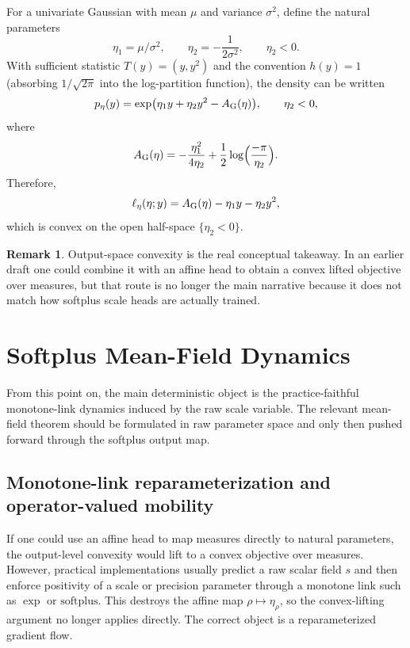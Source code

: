 \documentclass[11pt]{article}
\theoremstyle{definition}
\newtheorem{remark}[theorem]{Remark}
\begin{document}
For a univariate Gaussian with mean $\mu$ and variance $\sigma^2$, define the
natural parameters
\begin{equation}
  \eta_1 = \mu/\sigma^2,
  \qquad
  \eta_2 = -\frac{1}{2\sigma^2},
  \qquad
  \eta_2 < 0.
\end{equation}
With sufficient statistic $T(y)=(y,y^2)$ and the convention $h(y)=1$
(absorbing $1/\sqrt{2\pi}$ into the log-partition function), the density can
be written
\begin{equation}
  p_\eta(y) = \exp\!\big(\eta_1 y + \eta_2 y^2 - A_{\rm G}(\eta)\big),
  \qquad \eta_2<0,
\end{equation}
where
\begin{equation}
  A_{\rm G}(\eta)
  =
  -\frac{\eta_1^2}{4\eta_2}
  + \frac12 \log\!\Big(\frac{-\pi}{\eta_2}\Big).
\end{equation}
Therefore,
\begin{equation}
  \ell_{\eta}(\eta;y)
  =
  A_{\rm G}(\eta) - \eta_1 y - \eta_2 y^2,
\end{equation}
which is convex on the open half-space $\{\eta_2<0\}$.

\begin{remark}
Output-space convexity is the real conceptual takeaway. In an earlier draft one
could combine it with an affine head to obtain a convex lifted objective over
measures, but that route is no longer the main narrative because it does not
match how softplus scale heads are actually trained.
\end{remark}

\section{Softplus Mean-Field Dynamics}

From this point on, the main deterministic object is the practice-faithful
monotone-link dynamics induced by the raw scale variable. The relevant
mean-field theorem should be formulated in raw parameter space and only then
pushed forward through the softplus output map.

\subsection{Monotone-link reparameterization and operator-valued mobility}

If one could use an affine head to map measures directly to natural parameters,
the output-level convexity would lift to a convex objective over measures.
However, practical implementations
usually predict a raw scalar field $s$ and then enforce positivity of a scale
or precision parameter through a monotone link such as $\exp$ or
$\mathrm{softplus}$. This destroys the affine map $\rho\mapsto \eta_\rho$, so
the convex-lifting argument no longer applies directly. The correct object is a
reparameterized gradient flow.
\end{document}
